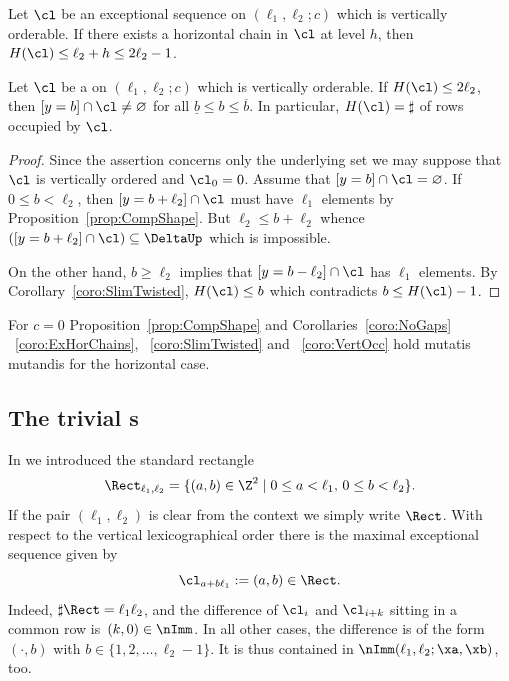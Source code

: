 \begin{coro}
\label{coro:SlimTwisted}
Let $\cl$ be an exceptional sequence 
on $(\ell_1,\ell_2;c)$ which is
vertically orderable. 
If there exists a horizontal chain in $\cl$ 
at level $h$, then $H(\cl)\leq\ell_2+h\leq
2\ell_2-1$.
\end{coro}

\begin{coro}
\label{coro:VertOcc}
{Let $\cl$ be a {\mes} 
on $(\ell_1,\ell_2;c)$ which is
vertically orderable. If 
$H(\cl)\leq2\ell_2$, 
then $[y=b]\cap\cl\not=\varnothing$ 
for all $\underline b\leq b\leq\overline b$.
In particular, $H(\cl)=\sharp$ of 
rows occupied by $\cl$.}
\end{coro}

\begin{proof}
{Since the assertion concerns only the
underlying set we may suppose that 
$\cl$ is vertically ordered and $\cl_0=0$.
Assume that
$[y=b]\cap\cl=\varnothing$. If $0\leq b<\ell_2$, 
then $[y=b+\ell_2]\cap\cl$ must have $\ell_1$ 
elements by Proposition~\ref{prop:CompShape}. 
But $\ell_2\leq b+\ell_2$ whence 
$([y=b+\ell_2]\cap\cl)\subseteq\DeltaUp$ which is 
impossible.}

{On the other hand, 
$b\geq\ell_2$ implies that 
$[y=b-\ell_2]\cap\cl$ has $\ell_1$ 
elements. By Corollary~\ref{coro:SlimTwisted},
$H(\cl)\leq b$ which contradicts $b\leq H(\cl)-1$.}
\end{proof}

\begin{rema}
For $c=0$ Proposition~\ref{prop:CompShape} and 
Corollaries~\ref{coro:NoGaps}
~\ref{coro:ExHorChains},
~\ref{coro:SlimTwisted} and
~\ref{coro:VertOcc} hold mutatis 
mutandis for the {horizontal} case. 
\end{rema}

\subsection{The trivial {\mes}s}
\label{subsec:TrivMes}
In 
we introduced the standard rectangle
$$
\Rect_{\ell_1,\ell_2}=\{(a,b)\in\Z^2
\mid0\leq a<\ell_1,\,0\leq b<\ell_2\}.
$$
{If the pair $(\ell_1,\ell_2)$ is clear from 
the context we simply write $\Rect$. With respect to 
the vertical lexicographical order there is the maximal exceptional 
sequence given by}
$$
\cl_{a+b\ell_1}:=(a,b)\in\Rect.
$$
Indeed, $\sharp\Rect=\ell_1\ell_2$, 
and the difference of $\cl_i$ and 
$\cl_{i+k}$ sitting in a common row is~$(k,0)\in\nImm$. In all other cases, the 
difference is of the form $(\cdot,b)$ with 
\mbox{$b\in\{1,2,\ldots,\ell_2-1\}$}. It is thus 
contained in $\nImm(\ell_1,\ell_2;\xa,\xb)$, too.


